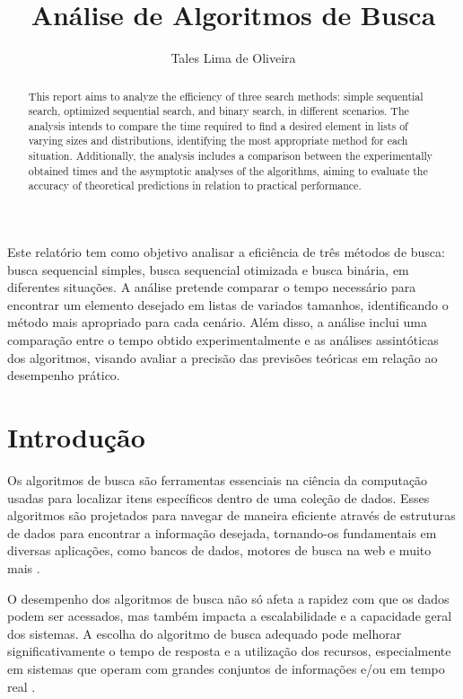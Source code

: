 \documentclass[12pt]{article}
\title{Análise de Algoritmos de Busca}
\author{Tales Lima de Oliveira\inst{1}}
\begin{document}
 

\maketitle

\begin{abstract}
    This report aims to analyze the efficiency of three search methods: simple sequential search, optimized sequential search, and binary search, in different scenarios. The analysis intends to compare the time required to find a desired element in lists of varying sizes and distributions, identifying the most appropriate method for each situation. Additionally, the analysis includes a comparison between the experimentally obtained times and the asymptotic analyses of the algorithms, aiming to evaluate the accuracy of theoretical predictions in relation to practical performance.
\end{abstract}
     
\begin{resumo} 
    Este relatório tem como objetivo analisar a eficiência de três métodos de busca: busca sequencial simples, busca sequencial otimizada e busca binária, em diferentes situações. A análise pretende comparar o tempo necessário para encontrar um elemento desejado em listas de variados tamanhos, identificando o método mais apropriado para cada cenário. Além disso, a análise inclui uma comparação entre o tempo obtido experimentalmente e as análises assintóticas dos algoritmos, visando avaliar a precisão das previsões teóricas em relação ao desempenho prático.
\end{resumo}






\section{Introdução}
    Os algoritmos de busca são ferramentas essenciais na ciência da computação usadas para localizar itens específicos dentro de uma coleção de dados. Esses algoritmos são projetados para navegar de maneira eficiente através de estruturas de dados para encontrar a informação desejada, tornando-os fundamentais em diversas aplicações, como bancos de dados, motores de busca na web e muito mais \cite{geeks:2024_search}.
    
    O desempenho dos algoritmos de busca não só afeta a rapidez com que os dados podem ser acessados, mas também impacta a escalabilidade e a capacidade geral dos sistemas. A escolha do algoritmo de busca adequado pode melhorar significativamente o tempo de resposta e a utilização dos recursos, especialmente em sistemas que operam com grandes conjuntos de informações e/ou em tempo real \cite{cormen:2009}.
\end{document}
